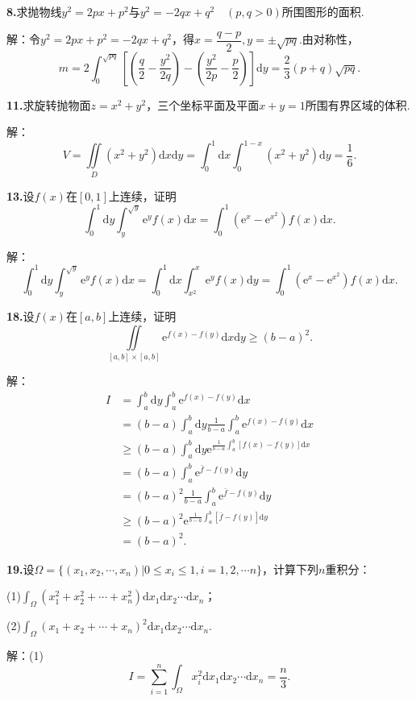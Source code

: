 \documentclass[12pt, a4paper]{article}
\newcommand{\e}{\mathrm{e}}
\newcommand{\dif}{\mathrm{d}}
\begin{document}
\textbf{8.}求抛物线\(y^2 = 2px + p^2\)与\(y^2 = -2qx + q^2 \quad (p, q > 0)\)所围图形的面积.

解：令\(y^2 = 2px + p^2 = -2qx + q^2\)，得\(x = \dfrac{q - p}{2}, y = \pm \sqrt{pq}\).由对称性，
\[m = 2\int_{0}^{\sqrt{pq}} \left[\left(\frac{q}{2} - \frac{y^2}{2q}\right) - \left(\frac{y^2}{2p} - \frac{p}{2}\right)\right] \dif y = \frac{2}{3}(p + q)\sqrt{pq}.\]

\textbf{11.}求旋转抛物面\(z = x^2 + y^2\)，三个坐标平面及平面\(x + y = 1\)所围有界区域的体积.

解：
\[V = \iint\limits_D (x^2 + y^2) \dif x \dif y = \int_0^1 \dif x \int_{0}^{1 - x} (x^2 + y^2) \dif y = \frac{1}{6}.\]

\textbf{13.}设\(f(x)\)在\([0, 1]\)上连续，证明
\[\int_0^1 \dif y \int_{y}^{\sqrt{y}} \e^y f(x) \dif x = \int_0^1 (\e^x - \e^{x^2}) f(x) \dif x.\]

解：
\[\int_0^1 \dif y \int_{y}^{\sqrt{y}} \e^y f(x) \dif x = \int_0^1 \dif x \int_{x^2}^{x} \e^y f(x) \dif y = \int_0^1 (\e^x - \e^{x^2}) f(x) \dif x.\]

\textbf{18.}设\(f(x)\)在\([a, b]\)上连续，证明
\[\iint\limits_{[a, b] \times [a, b]} \e^{f(x) - f(y)} \dif x \dif y \geq (b - a)^2.\]

解：
\begin{align*}
I &= \int_a^b \dif y \int_a^b \e^{f(x) - f(y)} \dif x \\
&= (b - a) \int_a^b \dif y \frac{1}{b - a} \int_a^b \e^{f(x) - f(y)} \dif x \\
&\geq (b - a) \int_a^b \dif y \e^{\frac{1}{b - a} \int_a^b [f(x) - f(y)] \dif x} \\
&= (b - a) \int_a^b \e^{\bar{f} - f(y)} \dif y \\
&= (b - a)^2 \frac{1}{b - a} \int_a^b \e^{\bar{f} - f(y)} \dif y \\
&\geq (b - a)^2 \e^{\frac{1}{b - a} \int_a^b [\bar{f} - f(y)] \dif y} \\
&= (b - a)^2.
\end{align*}

\textbf{19.}设\(\Omega = \{(x_1, x_2, \cdots, x_n)|0 \leq x_i \leq 1, i = 1, 2, \cdots n\}\)，计算下列\(n\)重积分：

(1)\(\int_\Omega (x_1^2 + x_2^2 + \cdots + x_n^2) \dif x_1 \dif x_2 \cdots \dif x_n\)；

(2)\(\int_\Omega (x_1 + x_2 + \cdots + x_n)^2 \dif x_1 \dif x_2 \cdots \dif x_n\).

解：(1)
\[I = \sum_{i = 1}^{n} \int_\Omega x_i^2 \dif x_1 \dif x_2 \cdots \dif x_n = \frac{n}{3}.\]
\end{document}

